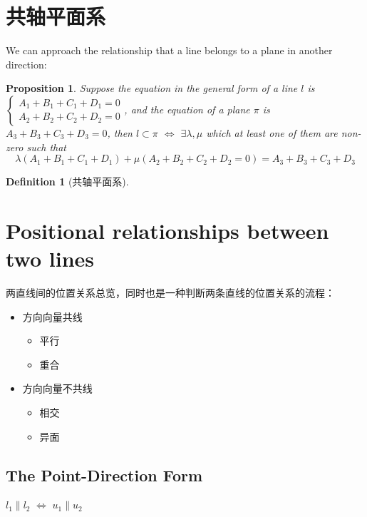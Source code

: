 \documentclass[onecolumn]{ctexart}
\newtheorem{definition}{Definition}
\newtheorem{proposition}{Proposition}
\begin{document}
\section{共轴平面系}
We can approach the relationship that a line belongs to a plane in another 
direction:
\begin{proposition}
  Suppose the equation in the general form of a line $l$ is $
  \begin{cases}
    A_1 + B_1 + C_1 + D_1 = 0 \\
    A_2 + B_2 + C_2 + D_2 = 0
  \end{cases}$, and the equation of a plane $\pi$ is $A_3 + B_3 + C_3 + D_3 = 0$, 
  then $l \subset \pi$ $\Leftrightarrow$ $\exists \lambda, \mu$ which at least 
  one of them are non-zero such that
  \begin{equation}
    \lambda (A_1 + B_1 + C_1 + D_1) + \mu (A_2 + B_2 + C_2 + D_2 = 0) = A_3 + B_3 + C_3 + D_3
  \end{equation}
\end{proposition}

\begin{definition}[共轴平面系]
  
\end{definition}

\section{Positional relationships between two lines}
两直线间的位置关系总览，同时也是一种判断两条直线的位置关系的流程：
\begin{itemize}
  \item 方向向量共线
  \begin{itemize}
    \item 平行
    \item 重合
  \end{itemize}
  \item 方向向量不共线
  \begin{itemize}
    \item 相交
    \item 异面
  \end{itemize}
\end{itemize}

\subsection{The Point-Direction Form}

$l_1 \parallel l_2$ $\Leftrightarrow$ $u_1 \parallel u_2$
\end{document}
